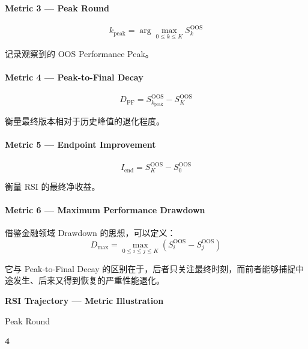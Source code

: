 \hypertarget{part-3-48-0001-metric-3-peak-round}{%
\paragraph{Metric 3 --- Peak Round}\label{part-3-48-0001-metric-3-peak-round}}

\[\boxed{
k_{\mathrm{peak}}
=
\arg\max_{0\leq k\leq K}
S_k^{\mathrm{OOS}}
}\]

记录观察到的 OOS Performance Peak。

\hypertarget{part-3-48-0001-metric-4-peak-to-final-decay}{%
\paragraph{Metric 4 --- Peak-to-Final Decay}\label{part-3-48-0001-metric-4-peak-to-final-decay}}

\[\boxed{
D_{\mathrm{PF}}
=
S_{k_{\mathrm{peak}}}^{\mathrm{OOS}}
-
S_K^{\mathrm{OOS}}
}\]

衡量最终版本相对于历史峰值的退化程度。

\hypertarget{part-3-48-0001-metric-5-endpoint-improvement}{%
\paragraph{Metric 5 --- Endpoint Improvement}\label{part-3-48-0001-metric-5-endpoint-improvement}}

\[\boxed{
I_{\mathrm{end}}
=
S_K^{\mathrm{OOS}}-S_0^{\mathrm{OOS}}
}\]

衡量 RSI 的最终净收益。

\hypertarget{part-3-48-0001-metric-6-maximum-performance-drawdown}{%
\paragraph{Metric 6 --- Maximum Performance Drawdown}\label{part-3-48-0001-metric-6-maximum-performance-drawdown}}

借鉴金融领域 Drawdown 的思想，可以定义：
\[\boxed{
D_{\max}
=
\max_{0\leq i\leq j\leq K}
\left(
S_i^{\mathrm{OOS}}-S_j^{\mathrm{OOS}}
\right)
}\]

它与 Peak-to-Final Decay 的区别在于，后者只关注最终时刻，而前者能够捕捉中途发生、后来又得到恢复的严重性能退化。

\textbf{RSI Trajectory --- Metric Illustration}


Peak Round

\textbf{4}

